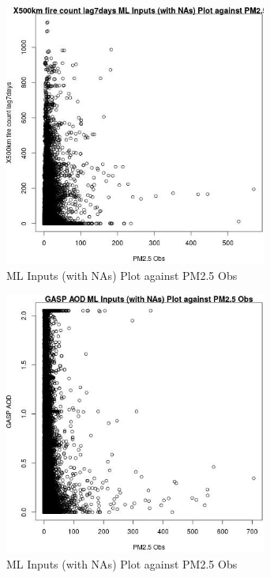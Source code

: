 \begin{figure} 
\centering  
\includegraphics[width=0.77\textwidth]{Code_Outputs/Report_ML_input_PM25_Step4_part_e_de_duplicated_aves_compiled_2019-05-14wNAs_X500km_fire_count_lag7daysvPM25_Obs.jpg} 
\caption{\label{fig:Report_ML_input_PM25_Step4_part_e_de_duplicated_aves_compiled_2019-05-14wNAsX500km_fire_count_lag7daysvPM25_Obs}ML Inputs (with NAs) Plot against PM2.5 Obs} 
\end{figure} 
 

\begin{figure} 
\centering  
\includegraphics[width=0.77\textwidth]{Code_Outputs/Report_ML_input_PM25_Step4_part_e_de_duplicated_aves_compiled_2019-05-14wNAs_GASP_AODvPM25_Obs.jpg} 
\caption{\label{fig:Report_ML_input_PM25_Step4_part_e_de_duplicated_aves_compiled_2019-05-14wNAsGASP_AODvPM25_Obs}ML Inputs (with NAs) Plot against PM2.5 Obs} 
\end{figure} 
 

